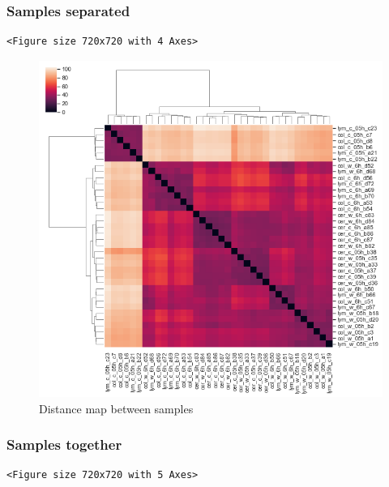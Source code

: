 \documentclass[a4paper]{article}
\begin{document}
\subsubsection{Samples separated}
\label{sec:orgd88a24b}

\begin{verbatim}
<Figure size 720x720 with 4 Axes>
\end{verbatim}

\begin{figure}[htbp]
\centering
\includegraphics[width=.9\linewidth]{obipy-resources/distancemap.png}
\caption{\label{distancemap}
Distance map between samples}
\end{figure}

\subsubsection{Samples together}
\label{sec:org274e0c9}

\begin{verbatim}
<Figure size 720x720 with 5 Axes>
\end{verbatim}
\end{document}
